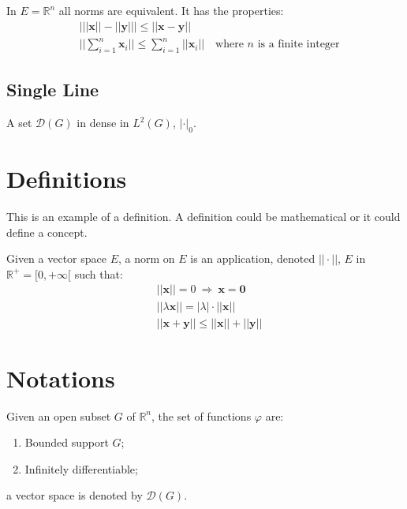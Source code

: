 \documentclass[11pt,fleqn]{book} %
\begin{document}
\begin{theorem}
In $E=\mathbb{R}^n$ all norms are equivalent. It has the properties:
\begin{align}
& \big| ||\mathbf{x}|| - ||\mathbf{y}|| \big|\leq || \mathbf{x}- \mathbf{y}||\\
&  ||\sum_{i=1}^n\mathbf{x}_i||\leq \sum_{i=1}^n||\mathbf{x}_i||\quad\text{where $n$ is a finite integer}
\end{align}
\end{theorem}

\subsection{Single Line}

\begin{theorem}
A set $\mathcal{D}(G)$ in dense in $L^2(G)$, $|\cdot|_0$. 
\end{theorem}


\section{Definitions}

This is an example of a definition. A definition could be mathematical or it could define a concept.

\begin{definition}
Given a vector space $E$, a norm on $E$ is an application, denoted $||\cdot||$, $E$ in $\mathbb{R}^+=[0,+\infty[$ such that:
\begin{align}
& ||\mathbf{x}||=0\ \Rightarrow\ \mathbf{x}=\mathbf{0}\\
& ||\lambda \mathbf{x}||=|\lambda|\cdot ||\mathbf{x}||\\
& ||\mathbf{x}+\mathbf{y}||\leq ||\mathbf{x}||+||\mathbf{y}||
\end{align}
\end{definition}


\section{Notations}

\begin{notation}
Given an open subset $G$ of $\mathbb{R}^n$, the set of functions $\varphi$ are:
\begin{enumerate}
\item Bounded support $G$;
\item Infinitely differentiable;
\end{enumerate}
a vector space is denoted by $\mathcal{D}(G)$. 
\end{notation}
\end{document}
